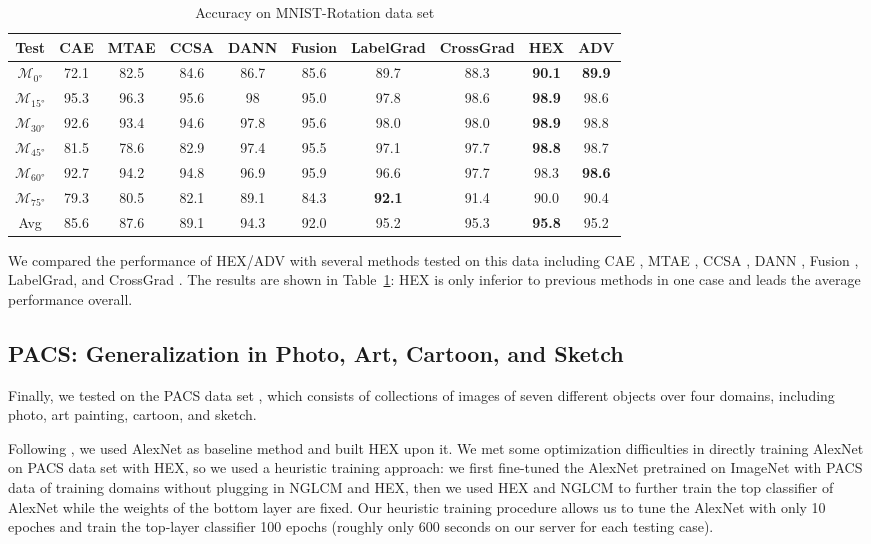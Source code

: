 \begin{table}[]
\centering
\begin{tabular}{cccccccccc}
\hline
Test & CAE & MTAE & CCSA & DANN & Fusion & LabelGrad & CrossGrad & HEX & ADV\\ \hline
$\mathcal{M}_{\ang{0}}$ & 72.1 & 82.5 & 84.6 & 86.7& 85.6 & 89.7 & 88.3 & \textbf{90.1} & \textbf{89.9} \\
$\mathcal{M}_{\ang{15}}$ & 95.3 & 96.3 & 95.6 & 98& 95.0 & 97.8 & 98.6 & \textbf{98.9} & 98.6 \\
$\mathcal{M}_{\ang{30}}$ & 92.6 & 93.4 & 94.6 & 97.8& 95.6 & 98.0 & 98.0 & \textbf{98.9} & 98.8 \\
$\mathcal{M}_{\ang{45}}$ & 81.5 & 78.6 & 82.9 & 97.4&95.5 & 97.1 & 97.7 & \textbf{98.8} & 98.7\\
$\mathcal{M}_{\ang{60}}$ & 92.7 & 94.2 & 94.8 & 96.9&95.9 & 96.6 & 97.7 & 98.3 & \textbf{98.6} \\
$\mathcal{M}_{\ang{75}}$ & 79.3 & 80.5 & 82.1 & 89.1& 84.3 & \textbf{92.1} & 91.4 & 90.0 & 90.4\\
\hline
Avg & 85.6 & 87.6 & 89.1 & 94.3 & 92.0 & 95.2 & 95.3 & \textbf{95.8} & 95.2 \\
\hline
\end{tabular}
\caption{Accuracy on MNIST-Rotation data set}
\label{tab:rotated}
\end{table}

We compared the performance of HEX/ADV with several methods tested on this data including CAE \citep{rifai2011contractive}, MTAE \citep{ghifary2015domain}, CCSA \citep{motiian2017unified}, DANN \citep{ganin2016domain}, Fusion \citep{mancini2018best}, LabelGrad, and CrossGrad \citep{shankar2018generalizing}. 
The results are shown in Table~\ref{tab:rotated}: 
HEX is only inferior to previous methods in one case 
and leads the average performance overall. 

\subsection{PACS: Generalization in Photo, Art, Cartoon, and Sketch}
Finally, we tested on the PACS data set \citep{li2017deeper}, which consists of collections of images of seven different objects over four domains, including photo, art painting, cartoon, and sketch. 

Following \citep{li2017deeper}, we used AlexNet as baseline method 
and built HEX upon it. 
We met some optimization difficulties in directly training AlexNet 
on PACS data set with HEX, 
so we used a heuristic training approach: 
we first fine-tuned the AlexNet pretrained on ImageNet 
with PACS data of training domains without plugging in NGLCM and HEX,
then we used HEX and NGLCM to further train the top classifier of AlexNet 
while the weights of the bottom layer are fixed. 
Our heuristic training procedure allows us to tune the AlexNet with only 10 epoches and train the top-layer classifier 100 epochs (roughly only 600 seconds on our server for each testing case). 

